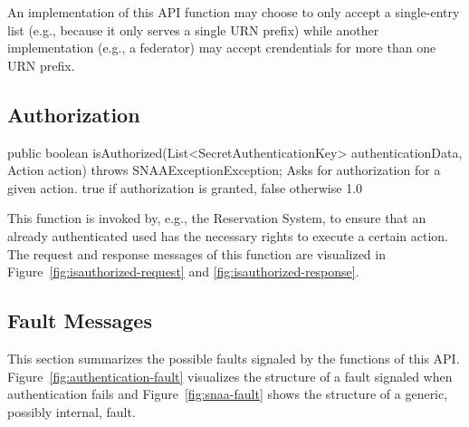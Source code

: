 \documentclass[a4paper,12pt]{article}
\begin{document}
An implementation of this API function may choose to only accept a single-entry list (e.g., because it only serves a single URN prefix) while another implementation (e.g., a federator) may accept crendentials for more than one URN prefix. 

	
			\subsection{Authorization}
			\label{sec:authorization}

\begin{apidoc}
	{public boolean isAuthorized(List<SecretAuthenticationKey> authenticationData, Action action) throws SNAAExceptionException;} %
	{Asks for authorization for a given action.} %
	{
	} %
	{true if authorization is granted, false otherwise} %
	{} %
	{1.0} %
\end{apidoc}

This function is invoked by, e.g., the Reservation System, to ensure that an already authenticated used has the necessary rights to execute a certain action. The request and response messages of this function are visualized in Figure~\ref{fig:isauthorized-request} and \ref{fig:isauthorized-response}.


			\subsection{Fault Messages}
			\label{sec:faults}
This section summarizes the possible faults signaled by the functions of this API. 
Figure~\ref{fig:authentication-fault} visualizes the structure of a fault signaled when authentication fails and  Figure~\ref{fig:snaa-fault} shows the structure of a generic, possibly internal, fault.
\end{document}
